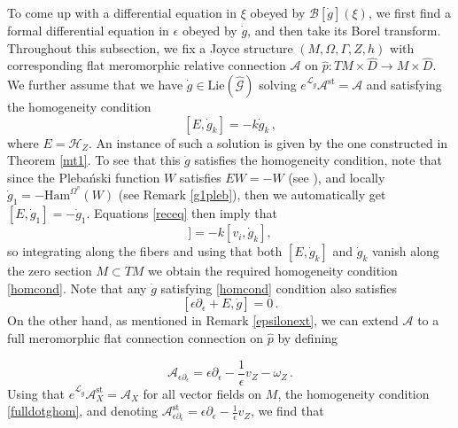 \documentclass{article}
\theoremstyle{definition}
\numberwithin{equation}{section}
\begin{document}
To come up with a differential equation in $\xi$ obeyed by $\mathcal{B}[\dot{g}](\xi)$, we first find a formal differential equation in $\epsilon$ obeyed by $\dot{g}$, and then take its Borel transform.\\

Throughout this subsection, we fix a Joyce structure $(M,\Omega,\Gamma,Z,h)$ with corresponding flat meromorphic relative connection $\mathcal{A}$ on $\hat{p}:TM\times \widehat{D}\to M\times \widehat{D}$. We further assume that we have $\dot{g}\in \text{Lie}(\widehat{\mathcal{G}})$ solving $e^{\mathcal{L}_{\dot{g}}}\mathcal{A}^{\text{st}}=\mathcal{A}$ and satisfying the homogeneity condition 
\begin{equation}\label{homcond}
    [E,\dot{g}_k]=-k\dot{g}_k\,,
\end{equation}
where $E=\mathcal{H}_{Z}$. An instance of such a solution is given by the one constructed in Theorem \ref{mt1}. To see that this $\dot{g}$ satisfies the homogeneity condition, note that since the Pleba\'nski function $W$ satisfies $EW=-W$ (see \cite[Lemma 3.7]{TwistorJoyce}), and  locally $\dot{g}_1=-\text{Ham}^{\Omega^{v}}(W)$ (see Remark \ref{g1pleb}), then we automatically get $[E,\dot{g}_1]=-\dot{g}_1$. Equations \eqref{receq} then imply that 
\begin{equation*}
    [v_i,[E,\dot{g}_k]]=-k[v_i,\dot{g}_k],
\end{equation*}
so integrating along the fibers and using that both $[E,\dot{g}_k]$ and $\dot{g}_k$ vanish along the zero section $M\subset TM$ we obtain the required homogeneity condition \eqref{homcond}. Note that any $\dot{g}$ satisfying \eqref{homcond} condition also satisfies
\begin{equation}\label{fulldotghom}
    [\epsilon\partial_{\epsilon}+E, \dot{g}]
=0\,.\end{equation}
On the other hand, as mentioned in Remark \ref{epsilonext}, we can extend $\mathcal{A}$ to a full meromorphic flat connection connection on $\hat{p}$ by defining

\begin{equation*}
    \mathcal{A}_{\epsilon \partial_{\epsilon}}=\epsilon\partial_{\epsilon}-\frac{1}{\epsilon}v_Z - \omega_Z\,.
\end{equation*}
Using that $e^{\mathcal{L}_{\dot{g}}}\mathcal{A}^{\text{st}}_X=\mathcal{A}_X$ for all vector fields on $M$, the homogeneity condition \eqref{fulldotghom}, and denoting $\mathcal{A}^{\text{st}}_{\epsilon \partial_{\epsilon}}=\epsilon\partial_{\epsilon}-\frac{1}{\epsilon}v_Z$, we find that
\end{document}
